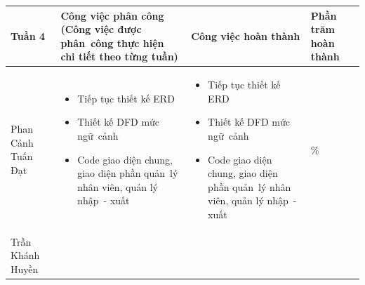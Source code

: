 \documentclass[a4paper,12pt]{report}
\begin{document}
\vspace{1em}

\noindent
\begin{center}
    \begin{longtable}{|>{\centering\arraybackslash}p{3cm}|
        >{\centering\arraybackslash}p{5.5cm}|
        >{\centering\arraybackslash}p{5.5cm}|
        >{\centering\arraybackslash}p{1.5cm}|}
        \hline
        \textbf{Tuần 4}                                                                                                               &
        \textbf{Công việc phân công \newline
            (Công việc được phân~công thực hiện chi tiết theo từng tuần)
        }                                                                                                                             &
        \textbf{Công việc hoàn thành}                                                                                                 &
        \textbf{Phần trăm hoàn thành}                                                                                                         \\
        \hline
        Phan Cảnh Tuấn Đạt                                                                                                            &
        \begin{itemize}
            \item Tiếp tục thiết kế ERD
            \item Thiết kế DFD mức ngữ~cảnh
            \item Code giao diện chung, giao diện phần quản~lý nhân viên, quản lý nhập~- xuất
        \end{itemize}                                             &
        \begin{itemize}
            \item Tiếp tục thiết kế ERD
            \item Thiết kế DFD mức ngữ~cảnh
            \item Code giao diện chung, giao diện phần quản~lý nhân viên, quản lý nhập~- xuất
        \end{itemize}
                                                                                                                                      & 100\% \\
        \hline
        Trần Khánh Huyền                                                                                                              &
        \begin{itemize}

\end{itemize}
\end{longtable}
\end{center}
\end{document}
